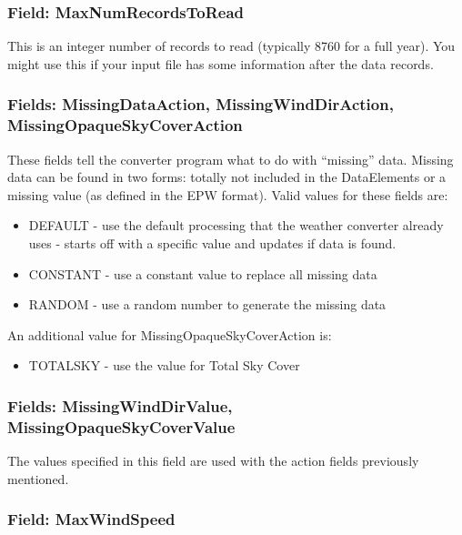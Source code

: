 \subsubsection{Field: MaxNumRecordsToRead}\label{field-maxnumrecordstoread}

This is an integer number of records to read (typically 8760 for a full year). You might use this if your input file has some information after the data records.

\subsubsection{Fields: MissingDataAction, MissingWindDirAction, MissingOpaqueSkyCoverAction}\label{fields-missingdataaction-missingwinddiraction-missingopaqueskycoveraction}

These fields tell the converter program what to do with ``missing'' data. Missing data can be found in two forms: totally not included in the DataElements or a missing value (as defined in the EPW format). Valid values for these fields are:

\begin{itemize}
\item
  DEFAULT - use the default processing that the weather converter already uses - starts off with a specific value and updates if data is found.
\item
  CONSTANT - use a constant value to replace all missing data
\item
  RANDOM - use a random number to generate the missing data
\end{itemize}

An additional value for MissingOpaqueSkyCoverAction is:

\begin{itemize}
\tightlist
\item
  TOTALSKY - use the value for Total Sky Cover
\end{itemize}

\subsubsection{Fields: MissingWindDirValue, MissingOpaqueSkyCoverValue}\label{fields-missingwinddirvalue-missingopaqueskycovervalue}

The values specified in this field are used with the action fields previously mentioned.

\subsubsection{Field: MaxWindSpeed}\label{field-maxwindspeed}

